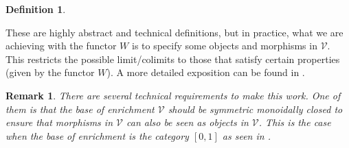 \documentclass[10pt,a4paper]{elsarticle}
\newcommand{\V}{\mathcal{V}}
\newtheorem{definition}[theorem]{Definition}
\newtheorem{re}[theorem]{Remark}
\begin{document}
{\begin{definition}
	\end{definition}
	
	These are highly abstract and technical definitions, but in practice, what we are achieving with the functor $W$ is to specify some objects and morphisms in $\V$. This restricts the possible limit/colimits to those that satisfy certain properties (given by the functor $W$). A more detailed exposition can be found in \cite[Chapter 7]{riehl2014categorical}.
	
	\begin{re}
		There are several technical requirements to make this work. One of them is that the base of enrichment $\V$ should be symmetric monoidally closed to ensure that morphisms in $\V$ can also be seen as objects in $\V$. This is the case when the base of enrichment is the category $[0,1]$ as seen in \cite[Section 2.1]{CatSem}.
		
	\end{re}
}








\newpage
%


\end{document}
